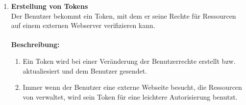 \documentclass[parskip=full,11pt]{scrartcl}
\def\threedigits#1{%
  \ifnum#1<10 0\fi
  \ifnum#1<1 0\fi
  \number#1}
\begin{document}
\begin{enumerate}[label={\textbf{/F\protect\threedigits{\theenumi}0/}}, leftmargin=*]
\item \label{FAB10} \colorbox{shadecolor}{\textbf{Erstellung von Tokens}}\\ Der Benutzer bekommt ein Token, mit dem er seine Rechte für Ressourcen auf einem externen Webserver verifizieren kann.\\\\
\textbf{Beschreibung:}\\
\begin{enumerate}[label=(\arabic*), leftmargin=*]
\item Ein Token wird bei einer Veränderung der Benutzerrechte erstellt bzw. aktualiesiert und dem Benutzer gesendet. 
\item Immer wenn der Benutzer eine externe Webseite besucht, die Ressourcen von \grqq \: verwaltet, wird sein Token für eine leichtere Autorisierung benutzt. 

\end{enumerate}
\end{enumerate}
\end{document}
